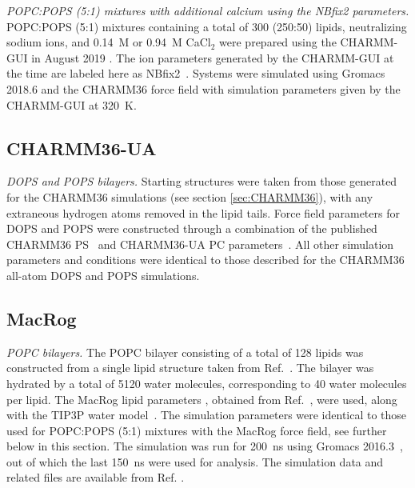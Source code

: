 \documentclass[journal=jpcbfk,manuscript=article]{achemso}
\newcommand{\todo}[1]{\textcolor{red}{#1}}
\begin{document}
\noindent
{\it POPC:POPS (5:1) mixtures with  additional calcium using the NBfix2 parameters.}
POPC:POPS (5:1) mixtures containing a total of 300 (250:50) lipids, neutralizing sodium ions, 
and 0.14~M or 0.94~M CaCl$_2$ were prepared using the CHARMM-GUI in August 2019 \cite{lee16,jo18}.
The ion parameters generated by the CHARMM-GUI at the time are labeled here as NBfix2~\cite{han2018graph}. Systems were simulated using Gromacs 2018.6 \cite{abraham2015gromacs} and the CHARMM36 force field with simulation parameters given
by the CHARMM-GUI at 320~K.  \\

\subsection{CHARMM36-UA}
\noindent
{\it DOPS and POPS bilayers.} 
Starting structures %
were taken from those generated for the CHARMM36 simulations (see section \ref{sec:CHARMM36}),
with any extraneous hydrogen atoms removed in the lipid tails. Force field parameters for DOPS and POPS were constructed through a
combination of the published CHARMM36 PS~\cite{venable13} and CHARMM36-UA PC parameters~\cite{lee14}.
All other simulation parameters and conditions were identical to those described for the CHARMM36 all-atom DOPS and POPS simulations.


\subsection{MacRog}
\noindent
{\it POPC bilayers.} 
The POPC bilayer consisting of a total of 128 lipids was constructed from a single lipid structure taken 
from Ref.~. The bilayer was hydrated by a total of 5120 water 
molecules, corresponding to 40 water molecules per lipid.
The MacRog lipid parameters \cite{kulig15b}, obtained from Ref.~, were used,
along with the TIP3P water model~\cite{jorgensen83}. The simulation parameters were identical to those used for 
POPC:POPS (5:1) mixtures with the MacRog force field, see further below in this section. The simulation was run for 200~ns using Gromacs 2016.3~\cite{abraham2015gromacs}, 
out of which the last 150~ns were used for analysis. The simulation data and related files are available from Ref. .
\end{document}
